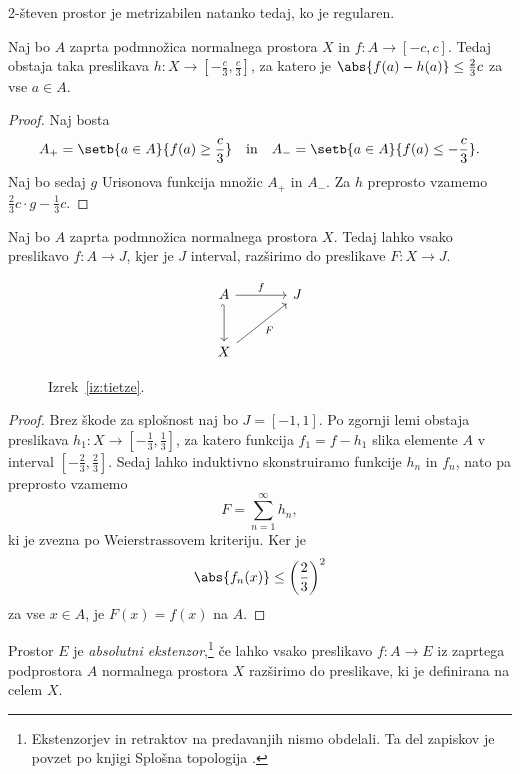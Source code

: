 \begin{posledica}
2-števen prostor je metrizabilen natanko tedaj, ko je regularen.
\end{posledica}

\begin{lema}
Naj bo $A$ zaprta podmnožica normalnega prostora $X$ in
$f \colon A \to [-c,c]$. Tedaj obstaja taka preslikava
$h \colon X \to \left[-\frac{c}{3},\frac{c}{3}\right]$, za katero
je $\abs{f(a) - h(a)} \leq \frac{2}{3} c$ za vse $a \in A$.
\end{lema}

\begin{proof}
Naj bosta
\[
A_+ = \setb{a \in A}{f(a) \geq \frac{c}{3}}
\quad \text{in} \quad
A_- = \setb{a \in A}{f(a) \leq -\frac{c}{3}}.
\]
Naj bo sedaj $g$ Urisonova funkcija množic $A_+$ in $A_-$. Za $h$
preprosto vzamemo $\frac{2}{3}c \cdot g - \frac{1}{3}c$.
\end{proof}

\begin{izrek}[Tietze]\label{iz:tietze}
Naj bo $A$ zaprta podmnožica normalnega prostora $X$. Tedaj lahko
vsako preslikavo $f \colon A \to J$, kjer je $J$ interval,
razširimo  do preslikave $F \colon X \to J$.
\end{izrek}

\begin{figure}[H]
\[
\begin{tikzcd}[column sep=large, row sep=large]
A \arrow[r, "f"] \arrow[d, hook'] & J \\
X \arrow[ur, "F"']                &
\end{tikzcd}
\]
\caption{Izrek~\ref{iz:tietze}.}
\end{figure}

\begin{proof}
Brez škode za splošnost naj bo $J=[-1,1]$. Po zgornji lemi obstaja
preslikava
$h_1 \colon X \to \left[-\frac{1}{3},\frac{1}{3}\right]$, za katero
funkcija $f_1 = f - h_1$ slika elemente $A$ v interval
$\left[-\frac{2}{3},\frac{2}{3}\right]$. Sedaj lahko induktivno
skonstruiramo funkcije $h_n$ in $f_n$, nato pa preprosto vzamemo
\[
F = \sum_{n=1}^\infty h_n,
\]
ki je zvezna po Weierstrassovem kriteriju. Ker je
\[
\abs{f_n(x)} \leq \left(\frac{2}{3}\right)^2
\]
za vse $x \in A$, je $F(x)=f(x)$ na $A$.
\end{proof}

\begin{definicija}
Prostor $E$ je
\emph{absolutni ekstenzor},\footnote{Ekstenzorjev
in retraktov na predavanjih nismo obdelali. Ta del zapiskov je
povzet po knjigi Splošna topologija \cite{stop}.}
če lahko vsako preslikavo $f \colon A \to E$ iz zaprtega
podprostora $A$ normalnega prostora $X$ razširimo do preslikave, ki
je definirana na celem $X$.
\end{definicija}

